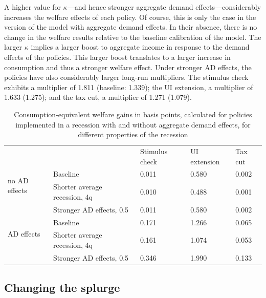 \documentclass[\econtexRoot/HAFiscal]{subfiles}
\begin{document}
A higher value for $\kappa$---and hence stronger aggregate demand effects---considerably increases the welfare effects of each policy. Of course, this is only the case in the version of the model with aggregate demand effects. In their absence, there is no change in the welfare results relative to the baseline calibration of the model. The larger $\kappa$ implies a larger boost to aggregate income in response to the demand effects of the policies. This larger boost translates to a larger increase in consumption and thus a stronger welfare effect. Under stronger AD effects, the policies have also considerably larger long-run multipliers. The stimulus check exhibits a multiplier of 1.811 (baseline: 1.339); the UI extension, a multiplier of 1.633 (1.275); and the tax cut, a multiplier of 1.271 (1.079).


\begin{table}[]
  \begin{center}
    \begin{tabular}{@{}lllll@{}}
      \toprule
      &                    											& Stimulus check & UI extension & Tax cut 	\\ \cmidrule(l){1-5}
      \multirow{2}{*}{no AD effects} 					& Baseline 						& 0.011          & 0.580        & 0.002   	\\ 
      & Shorter average recession, 4q & 0.010          & 0.488        & 0.001  	\\
      & Stronger AD effects, 0.5 		& 0.011          & 0.580        & 0.002   	\\ \cmidrule(l){1-5}
      \multirow{2}{*}{AD effects}						& Baseline    					& 0.171          & 1.266        & 0.065   	\\
      & Shorter average recession, 4q & 0.161          & 1.074        & 0.053   	\\
      & Stronger AD effects, 0.5    	& 0.346          & 1.990        & 0.133   	\\ \cmidrule(l){1-5} 
    \end{tabular}
    \caption{Consumption-equivalent welfare gains in basis points, calculated for policies implemented in a recession with and without aggregate demand effects, for different properties of the recession}
    \notinsubfile{\label{tab:robustness_recession_property_results}}
  \end{center}
\end{table}


\FloatBarrier
\hypertarget{changing-the-splurge}{}\par\subsection{Changing the splurge}
\end{document}
